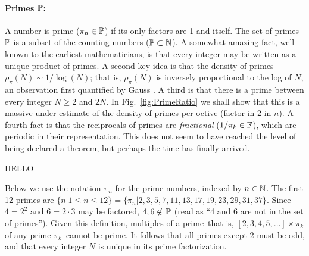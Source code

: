 \documentclass{ximera}
\begin{document}


\paragraph{Primes $\P$:}%

\label{page:bbP} %
A number is prime ($\pi_n \in\P$) if its only factors are 1 and itself. %
The set of primes $\P$ is a subset of the counting numbers ($\P \subset \N$). A somewhat amazing
fact, well known to the earliest mathematicians, is that every integer may be written as a unique
product of primes. A second key idea is that the density of primes $\rho_\pi(N) \sim 1/\log(N)$; that is, $\rho_\pi(N)$ is inversely proportional to the log of $N$,
an observation first quantified by Gauss \citep{Goldstein73}.
A third is that there is a prime between every integer $N\ge2$ and $2N$.  %
 
In Fig.~\ref{fig:PrimeRatio} we shall show that this is a massive under estimate of the density of primes per octive (factor in 2 in $n$).
%
A fourth fact is that the reciprocals of primes are \emph{fractional} ($1/\pi_k\in \F$), which are periodic in their representation.%
This does not seem to have reached the level of being declared a theorem, but perhaps the time has finally arrived.

HELLO


Below we use the notation $\pi_n$ for the prime numbers, indexed by $n\in\N$. 
The first 12 primes are $\{n | 1 \le n \le 12\} = \{\pi_n | 2, 3, 5, 7, 11, 13, 17, 19, 23, 29, 31, 37 \}$.
Since $4=2^2$ and $6=2 \cdot 3$ may be factored,  $4, 6 \not\in \, \P$ (read as ``4 and 6
are not in the set of primes'').  Given this definition, multiples of a prime--that is, $[2, 3, 4, 5, \ldots] \times \pi_k$ of any prime $\pi_k$--cannot be prime.
It follows that all primes except 2 must be odd, and that every integer $N$ is unique in its prime factorization.
\end{document}
